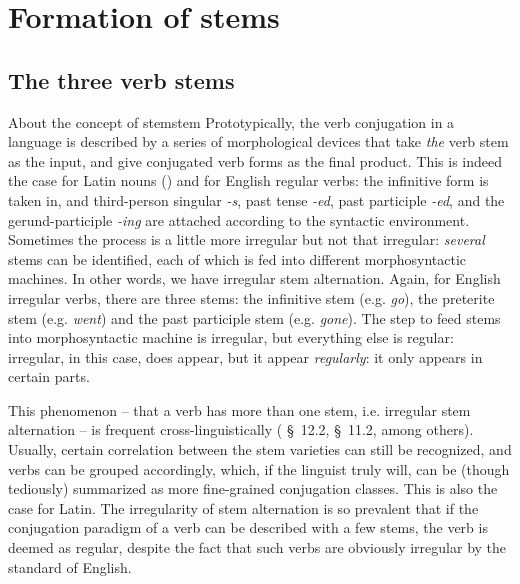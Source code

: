 \documentclass[UTF8, a4paper, oneside]{report}
\newcommand*{\citesec}[1]{\S~{#1}}
\newcommand{\corpus}[1]{\emph{#1}}
\begin{document}
\section{Formation of stems}

\subsection{The three verb stems}\label{sec:three-latin-stem}

\begin{theorybox}{About the concept of stem}{stem}
    Prototypically, the verb conjugation in a language is described by 
    a series of morphological devices that take \emph{the} verb stem as the input,
    and give conjugated verb forms as the final product.
    This is indeed the case for Latin nouns ()
    and for English regular verbs:
    the infinitive form is taken in,
    and third-person singular \corpus{-s}, past tense \corpus{-ed}, 
    past participle \corpus{-ed}, and the gerund-participle \corpus{-ing}
    are attached according to the syntactic environment.
    Sometimes the process is a little more irregular but not that irregular:
    \emph{several} stems can be identified, each of which is fed into different morphosyntactic machines.
    In other words, we have irregular stem alternation.
    Again, for English irregular verbs,
    there are three stems: the infinitive stem (e.g. \corpus{go}), 
    the preterite stem (e.g. \corpus{went})
    and the past participle stem (e.g. \corpus{gone}).
    The step to feed stems into morphosyntactic machine is irregular,
    but everything else is regular:
    irregular, in this case, does appear, but it appear \emph{regularly}:
    it only appears in certain parts.

    This phenomenon -- that a verb has more than one stem, i.e. irregular stem alternation
    -- is frequent cross-linguistically
    (\citealt{jacques2021grammar} \citesec{12.2}, \citealt{forker2020grammar} \citesec{11.2}, among others).
    Usually, certain correlation between the stem varieties can still be recognized,
    and verbs can be grouped accordingly,
    which, if the linguist truly will, 
    can be (though tediously) summarized as more fine-grained conjugation classes.
    This is also the case for Latin.
    The irregularity of stem alternation is so prevalent
    that if the conjugation paradigm of a verb can be described with a few stems,
    the verb is deemed as regular, 
    despite the fact that such verbs are obviously irregular by the standard of English.


\end{theorybox}
\end{document}
